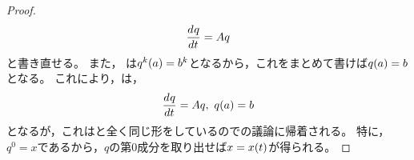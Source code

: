 \documentclass[b5paper,draft,oneside,openany]{ltjsbook} %
\begin{document}
\begin{prop}[定数係数線型斉次常微分方程式の解の存在と一意性]
\begin{proof}
\begin{equation}
            \frac{d^{} q}{d t^{}}=Aq
        \end{equation}
        と書き直せる。
        また，
        は$\fun{q^k}{a}=b^k$となるから，これをまとめて書けば$\fun{q}{a}=b$となる。
        これにより，は，
        \begin{equation}
            \diff{q}{t}=Aq,\
            \fun{q}{a}=b
        \end{equation}
        となるが，これはと全く同じ形をしているのでの議論に帰着される。
        特に，$q^0=x$であるから，$q$の第0成分を取り出せば$x=\fun{x}{t}$が得られる。
    \end{proof}
\end{prop}
\end{document}

